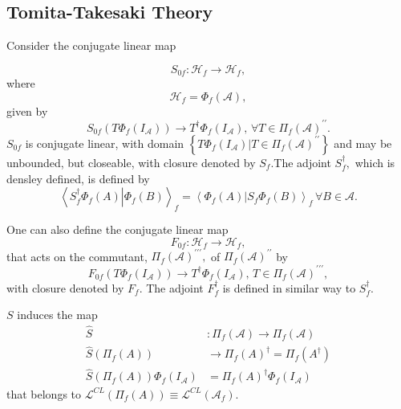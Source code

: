 \documentclass[aps,preprint]{revtex4}%
\begin{document}
\subsection{Tomita-Takesaki Theory}

Consider the conjugate linear map%

\begin{equation}
S_{0f}:\mathcal{H}_{f}\rightarrow\mathcal{H}_{f},
\end{equation}
where
\begin{equation}
\mathcal{H}_{f}=\Phi_{f}\left(  \mathcal{A}\right)  ,
\end{equation}
given by%
\begin{equation}
S_{0f}\left(  T\Phi_{f}\left(  I_{\mathcal{A}}\right)  \right)  \rightarrow
T^{\dagger}\Phi_{f}\left(  I_{\mathcal{A}}\right)  ,\,\forall T\in\Pi
_{f}\left(  \mathcal{A}\right)  ^{\prime\prime}.
\end{equation}
$S_{0f}$ is conjugate linear, with domain $\left\{  \left.  T\Phi_{f}\left(
I_{\mathcal{A}}\right)  \right\vert T\in\Pi_{f}\left(  \mathcal{A}\right)
^{\prime\prime}\right\}  $ and may be unbounded, but closeable, with closure
denoted by $S_{f}.$The adjoint $S_{f}^{\dagger},$ which is densley defined, is
defined by
\begin{equation}
\left\langle \left.  S_{f}^{\dagger}\Phi_{f}\left(  A\right)  \right\vert
\Phi_{f}\left(  B\right)  \right\rangle _{f}=\left\langle \left.  \Phi
_{f}\left(  A\right)  \right\vert S_{f}\Phi_{f}\left(  B\right)  \right\rangle
_{f}\,\forall B\in\mathcal{A}.
\end{equation}


One can also define the conjugate linear map
\begin{equation}
F_{0f}:\mathcal{H}_{f}\rightarrow\mathcal{H}_{f},
\end{equation}
that acts on the commutant, $\Pi_{f}\left(  \mathcal{A}\right)  ^{\prime
\prime\prime},$ of $\Pi_{f}\left(  \mathcal{A}\right)  ^{\prime\prime}$ by%
\begin{equation}
F_{0f}\left(  T\Phi_{f}\left(  I_{\mathcal{A}}\right)  \right)  \rightarrow
T^{\dagger}\Phi_{f}\left(  I_{\mathcal{A}}\right)  ,\,T\in\Pi_{f}\left(
\mathcal{A}\right)  ^{\prime\prime\prime},
\end{equation}
with closure denoted by $F_{f}.$ The adjoint $F_{f}^{\dagger}$ is defined in
similar way to $S_{f}^{\dagger}.$

$S$ induces the map
\begin{align*}
\widehat{S}  &  :\Pi_{f}\left(  \mathcal{A}\right)  \rightarrow\Pi_{f}\left(
\mathcal{A}\right) \\
\widehat{S}\left(  \Pi_{f}\left(  A\right)  \right)   &  \rightarrow\Pi
_{f}\left(  A\right)  ^{\dagger}=\Pi_{f}\left(  A^{\dagger}\right) \\
\widehat{S}\left(  \Pi_{f}\left(  A\right)  \right)  \Phi_{f}\left(
I_{\mathcal{A}}\right)   &  =\Pi_{f}\left(  A\right)  ^{\dagger}\Phi
_{f}\left(  I_{\mathcal{A}}\right)
\end{align*}
that belongs to $\mathcal{L}^{CL}\left(  \Pi_{f}\left(  A\right)  \right)
\equiv\mathcal{L}^{CL}\left(  \mathcal{A}_{f}\right)  .$
\end{document}
